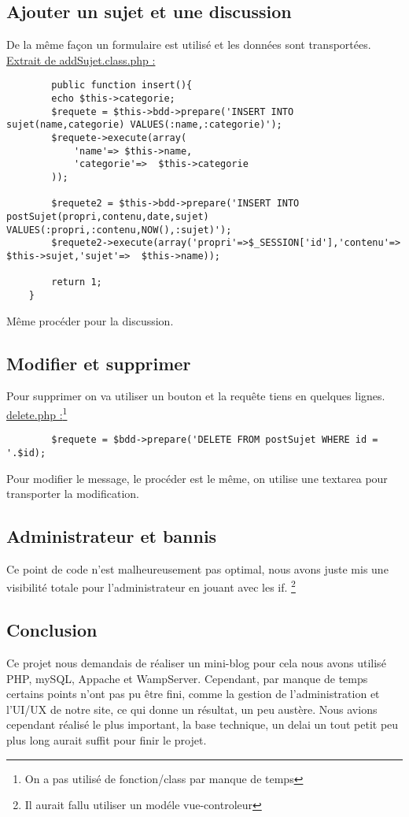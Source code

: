 \documentclass{article}
\begin{document}
    \subsection{Ajouter un sujet et une discussion}
    
    De la même façon un formulaire est utilisé et les données sont transportées. 
    \underline{Extrait de addSujet.class.php :}
    \begin{lstlisting}
        public function insert(){
        echo $this->categorie;
        $requete = $this->bdd->prepare('INSERT INTO sujet(name,categorie) VALUES(:name,:categorie)');
        $requete->execute(array(
            'name'=> $this->name,
            'categorie'=>  $this->categorie
        ));
        
        $requete2 = $this->bdd->prepare('INSERT INTO postSujet(propri,contenu,date,sujet) VALUES(:propri,:contenu,NOW(),:sujet)');
        $requete2->execute(array('propri'=>$_SESSION['id'],'contenu'=>  $this->sujet,'sujet'=>  $this->name));
        
        return 1;
    }
    \end{lstlisting}
    Même procéder pour la discussion.
    \subsection{Modifier et supprimer}
    Pour supprimer on va utiliser un bouton et la requête tiens en quelques lignes. 
    \\
    \underline{delete.php :}\footnote{On a pas utilisé de fonction/class par manque de temps}
    \begin{lstlisting}
        $requete = $bdd->prepare('DELETE FROM postSujet WHERE id = '.$id);
    \end{lstlisting}
    Pour modifier le message, le procéder est le même, on utilise une textarea pour transporter la modification. 
    \subsection{Administrateur et bannis}
    Ce point de code n'est malheureusement pas optimal, nous avons juste mis une visibilité totale pour l'administrateur
    en jouant avec les if. \footnote{Il aurait fallu utiliser un modéle vue-controleur}
    \newpage
    \subsection*{Conclusion}
    Ce projet nous demandais de réaliser un mini-blog pour cela nous avons utilisé PHP, mySQL, Appache et WampServer. Cependant, par manque de temps certains points n'ont pas pu être fini, comme la gestion de l'administration et l'UI/UX de notre site, ce qui donne un résultat, un peu austère. Nous avions cependant réalisé le plus important, la base technique, un delai un tout petit peu plus long aurait suffit pour finir le projet.
\end{document}
